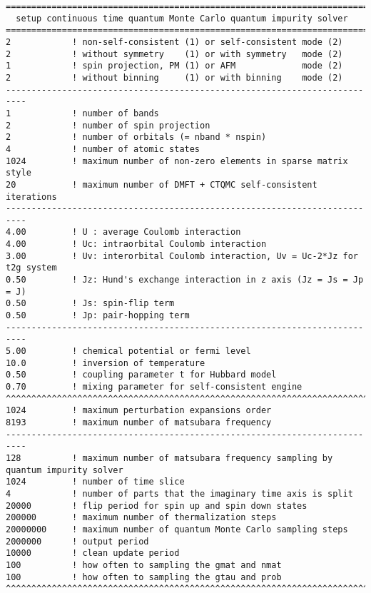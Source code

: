 \begin{lstlisting}[frame=single]
==========================================================================
  setup continuous time quantum Monte Carlo quantum impurity solver
==========================================================================
2            ! non-self-consistent (1) or self-consistent mode (2)
2            ! without symmetry    (1) or with symmetry   mode (2)
1            ! spin projection, PM (1) or AFM             mode (2)
2            ! without binning     (1) or with binning    mode (2)
--------------------------------------------------------------------------
1            ! number of bands
2            ! number of spin projection
2            ! number of orbitals (= nband * nspin)
4            ! number of atomic states
1024         ! maximum number of non-zero elements in sparse matrix style
20           ! maximum number of DMFT + CTQMC self-consistent iterations
--------------------------------------------------------------------------
4.00         ! U : average Coulomb interaction
4.00         ! Uc: intraorbital Coulomb interaction
3.00	     ! Uv: interorbital Coulomb interaction, Uv = Uc-2*Jz for t2g system
0.50         ! Jz: Hund's exchange interaction in z axis (Jz = Js = Jp = J)
0.50         ! Js: spin-flip term
0.50         ! Jp: pair-hopping term
--------------------------------------------------------------------------
5.00         ! chemical potential or fermi level
10.0         ! inversion of temperature
0.50         ! coupling parameter t for Hubbard model
0.70         ! mixing parameter for self-consistent engine
^^^^^^^^^^^^^^^^^^^^^^^^^^^^^^^^^^^^^^^^^^^^^^^^^^^^^^^^^^^^^^^^^^^^^^^^^^
1024         ! maximum perturbation expansions order
8193         ! maximum number of matsubara frequency
--------------------------------------------------------------------------
128          ! maximum number of matsubara frequency sampling by quantum impurity solver
1024         ! number of time slice
4            ! number of parts that the imaginary time axis is split
20000        ! flip period for spin up and spin down states
200000       ! maximum number of thermalization steps
20000000     ! maximum number of quantum Monte Carlo sampling steps
2000000      ! output period
10000        ! clean update period
100          ! how often to sampling the gmat and nmat
100          ! how often to sampling the gtau and prob
^^^^^^^^^^^^^^^^^^^^^^^^^^^^^^^^^^^^^^^^^^^^^^^^^^^^^^^^^^^^^^^^^^^^^^^^^^
\end{lstlisting}

